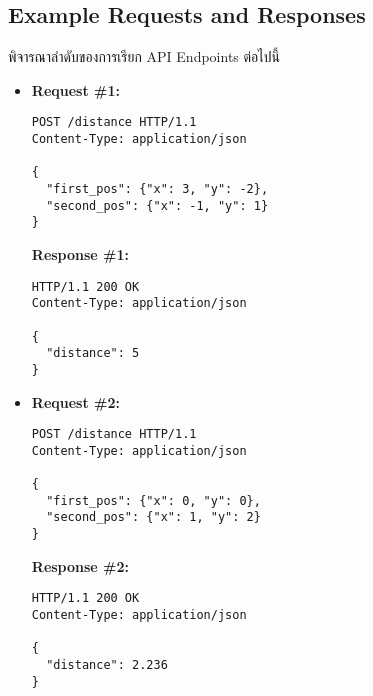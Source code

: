 \subsection{Example Requests and Responses}

\noindent
พิจารณาลำดับของการเรียก API Endpoints ต่อไปนี้

\begin{itemize}
\item  %
\textbf{Request \#1:}
\begin{lstlisting}[xleftmargin=1pc,numbers=none]
POST /distance HTTP/1.1
Content-Type: application/json

{
  "first_pos": {"x": 3, "y": -2},
  "second_pos": {"x": -1, "y": 1}
}
\end{lstlisting}
\textbf{Response \#1:}
\begin{lstlisting}[xleftmargin=1pc,numbers=none]
HTTP/1.1 200 OK
Content-Type: application/json

{
  "distance": 5
}
\end{lstlisting}

\newpage
\item  %
\textbf{Request \#2:}
\begin{lstlisting}[xleftmargin=1pc,numbers=none]
POST /distance HTTP/1.1
Content-Type: application/json

{
  "first_pos": {"x": 0, "y": 0},
  "second_pos": {"x": 1, "y": 2}
}
\end{lstlisting}
\textbf{Response \#2:}
\begin{lstlisting}[xleftmargin=1pc,numbers=none]
HTTP/1.1 200 OK
Content-Type: application/json

{
  "distance": 2.236
}
\end{lstlisting}
\end{itemize}
